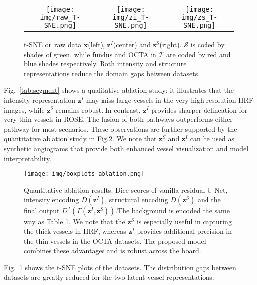 \documentclass[runningheads]{llncs}
\begin{document}
\begin{figure}[t]
    \centering
    \begin{tabular}{ccc}
         \texttt{[image: img/raw\_T-SNE.png]}&
         \texttt{[image: img/zi\_T-SNE.png]}&
         \texttt{[image: img/zs\_T-SNE.png]}\\
    \end{tabular}
    \caption{t-SNE on raw data $\mathbf{x}$(left), $\mathbf{z}^I$(center) and $\mathbf{z}^S$(right). $\mathcal{S}$ is coded by shades of green, while fundus and OCTA in $\mathcal{T}$ are coded by red and blue shades respectively. Both intensity and structure representations reduce the domain gaps between datasets.}
    \label{fig:TSNE}
\end{figure}


Fig.\ \ref{tab:segment} shows a qualitative ablation study: it illustrates that the intensity representation $\mathbf{z}^I$ may miss large vessels in the very high-resolution HRF images, while $\mathbf{z}^S$ remains robust. In contrast, $\mathbf{z}^I$ provides sharper delineation for very thin vessels in ROSE. The fusion of both pathways outperforms either pathway for most scenarios. These observations are further supported by the quantitative ablation study in Fig.\ref{fig:ablation_boxplot}. We note that $\mathbf{z}^S$ and $\mathbf{z}^I$ can be used as synthetic angiograms that provide both enhanced vessel visualization and model interpretability. 

\begin{figure}[t]
    \centering
    \texttt{[image: img/boxplots\_ablation.png]}
    \caption{Quantitative ablation results. Dice scores of vanilla residual U-Net, intensity encoding $D(\mathbf{z}^I)$, structural encoding $D(\mathbf{z}^S)$ and the final output $D^T(\Gamma(\mathbf{z}^I,\mathbf{z}^S))$.The background is encoded the same way as Table 1. We note that the $\mathbf{z}^S$ is especially useful in capturing the thick vessels in HRF, whereas $\mathbf{z}^I$ provides additional precision in the thin vessels in the OCTA datasets. The proposed model combines these advantages and is robust across the board.}
    \label{fig:ablation_boxplot}
\end{figure}

Fig.\ \ref{fig:TSNE} shows the t-SNE plots \cite{van2008visualizing} of the datasets. The distribution gaps between datasets are greatly reduced for the two latent vessel representations.
\end{document}
